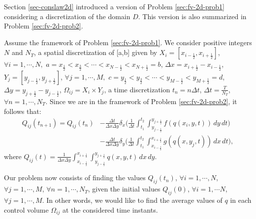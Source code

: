Section \ref{sec-conslaw2d} introduced a version of Problem \ref{sec:fv-2d-prob1}
considering a discretization of the domain $D$. 
This version is also summarized in Problem \ref{sec:fv-2d-prob2}.
\begin{prob}
	\label{sec:fv-2d-prob2}
	Assume the framework of Problem \ref{sec:fv-2d-prob1}.
	We consider positive integers $N$ and $N_T$, a spatial discretization of [a,b] given by
	$X_i = [x_{i-\frac{1}{2}}, x_{i+\frac{1}{2}}]$,
	$\forall i = 1, \cdots, N,$ 
	$a = x_{\frac{1}{2}} < x_{\frac{3}{2}} < \cdots < x_{N-\frac{1}{2}} < x_{N+\frac{1}{2}} = b$,
	$\Delta x = x_{i+\frac{1}{2}}-x_{i-\frac{1}{2}}$, $Y_j = [y_{j-\frac{1}{2}}, y_{j+\frac{1}{2}}]$,
	$\forall j = 1, \cdots, M,$ 
	$c = y_{\frac{1}{2}} < y_{\frac{3}{2}} < \cdots < y_{M-\frac{1}{2}} < y_{M+\frac{1}{2}} = d$,
	$\Delta y = y_{j+\frac{1}{2}}-y_{j-\frac{1}{2}}$,
	$\Omega_{ij} = X_i \times Y_j$,
	a time discretization
	$t_n = n\Delta t$, $\Delta t = \frac{T}{N_T}$, $\forall n = 1, \cdots, N_T$.
	Since we are in the framework of Problem \ref{sec:fv-2d-prob2}, it follows that:
	\begin{align*}
		{Q}_{ij}(t_{n+1})  = {Q}_{ij}(t_{n})
		&- \frac{\Delta t}{\Delta x \Delta y}
		\delta _x \bigg( \frac{1}{\Delta t}
		\int_{t_1}^{t_2} \int_{y_{j-\frac{1}{2}}}^{y_{j+\frac{1}{2}}} 
		{f}({q}(x_{i}, y, t))
		\,dy \,dt \bigg) \\ \nonumber
		&- \frac{\Delta t}{\Delta x \Delta y}
		\delta _y \bigg( \frac{1}{\Delta t}
		\int_{t_1}^{t_2} \int_{x_{i-\frac{1}{2}}}^{x_{i+\frac{1}{2}}} 
		{g}({q}(x, y_{j}, t))
		\,dx \,dt \bigg),
	\end{align*}
	where ${Q}_{ij}(t) = \frac{1}{\Delta x \Delta y}
	\int_{x_{i-\frac{1}{2}}}^{x_{i+\frac{1}{2}}} 
	\int_{y_{j-\frac{1}{2}}}^{y_{j+\frac{1}{2}}} {q}(x,y,t) \,dx \,dy$.
	
	Our problem now consists of finding the values ${Q}_{ij}(t_{n})$, 
	$\forall i = 1, \cdots, N$, $\forall j = 1, \cdots, M$, $\forall n = 1, \cdots, N_T$,
    given the initial values ${Q}_{ij}(0)$, $\forall i = 1, \cdots N$, $\forall j = 1, \cdots, M$.
	In other words, we would like to find the average values of ${q}$
	in each control volume $\Omega_{ij}$ at the considered time instants.
\end{prob}

